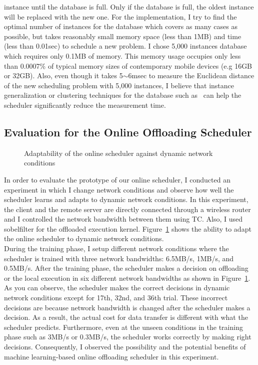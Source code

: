 instance until the database is full.
%
Only if the database is full, the oldest instance will be replaced with
the new one.
%
For the implementation, I try to find the optimal number of instances for
the database which covers as many cases as possible, but takes reasonably small 
memory space (less than 1MB) and time (less than 0.01sec) to schedule a
new problem.
%
I chose 5,000 instances database which requires only 0.1MB of memory.
%
This memory usage occupies only less than 0.0007\% of typical memory
sizes of
contemporary mobile devices (e.g 16GB or 32GB).
%
Also, even though it takes 5$\sim$6msec to measure the Euclidean
distance of the new scheduling problem with 5,000
instances, I believe that instance generalization or clustering techniques for
the database such as~\cite{domingos, chang} can help the
scheduler significantly reduce the measurement time. 
%

\subsection{Evaluation for the Online Offloading Scheduler}
\label{scheduler:online_eval}
%
\begin{figure}
\centering
{}
\caption{Adaptability of the online scheduler against dynamic network
conditions}
\label{fig:online}
\end{figure}

%
In order to evaluate the prototype of our online scheduler, I conducted
an experiment in which I change network conditions and observe how
well the scheduler learns and adapts to dynamic network conditions.
%
In this experiment, the client and the remote server are directly
connected through a wireless router and I controlled the network
bandwidth between them using TC.
%
Also, I used sobelfilter for the offloaded execution kernel.
%
Figure~\ref{fig:online} shows the ability to adapt the online scheduler to dynamic
network conditions.\\
%
\indent During the training phase, I setup different network conditions where
the scheduler is trained with three network bandwidths: 6.5MB/s, 1MB/s,
and 0.5MB/s.
%
After the training phase, the scheduler makes a decision on offloading
or the local execution in six different network bandwidths as shown in
Figure~\ref{fig:online}.
%
As you can observe, the scheduler makes the correct decisions in dynamic
network conditions except for 17th, 32nd, and 36th trial.
%
These incorrect decisions are because network bandwidth is changed
after the scheduler makes a decision.
%
As a result, the actual cost for data transfer is different with what
the scheduler predicts. 
%
Furthermore, even at the unseen conditions in the training phase such as
3MB/s or 0.3MB/s, the scheduler works correctly by making right
decisions.
%
Consequently, I observed the possibility and the potential benefits of
machine learning-based online offloading scheduler in this experiment. 
%
